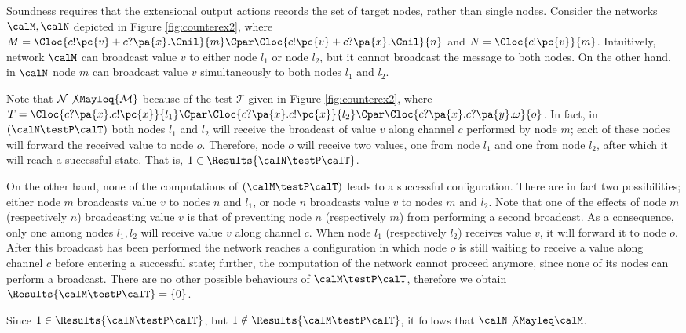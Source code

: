 \documentclass{LMCS}
\begin{document}
\begin{exa}
Soundness requires that the extensional output actions records the set of target nodes, rather than single nodes.
Consider the networks $\calM, \calN$ depicted in Figure \ref{fig:counterex2}, where 
$M = \Cloc{c!\pc{v} + c?\pa{x}.\Cnil}{m} \Cpar \Cloc{c!\pc{v} + c?\pa{x}.\Cnil}{n}$ and 
$N = \Cloc{c!\pc{v}}{m}$. 
Intuitively, network $\calM$ can broadcast value $v$ to either node $l_1$ or node $l_2$, 
but it cannot broadcast the message to both nodes. On the other hand, in $\calN$ node $m$ can 
broadcast value $v$ simultaneously to both nodes $l_1$ and $l_2$.

Note that 
${\mathcal N} \not\Mayleq {\mathcal M}$ because of the test
${\mathcal T}$ given in Figure \ref{fig:counterex2}, where $T = \Cloc{c?\pa{x}.c!\pc{x}}{l_1} \Cpar \Cloc{c?\pa{x}.c!\pc{x}}{l_2} 
\Cpar \Cloc{c?\pa{x}.c?\pa{y}.\omega}{o}$. 
In fact, in $(\calN \testP \calT)$ both nodes $l_1$ and $l_2$ will receive the broadcast of value $v$ along channel 
$c$ performed by node $m$; 
each of these nodes will forward the received value to node $o$. Therefore, node $o$ will receive two values, one 
from node $l_1$ and one from node $l_2$, after which it will reach a successful state. That is, 
$1 \in \Results{\calN \testP \calT}$.

On the other hand, none of the 
computations of $(\calM \testP \calT)$ leads to a successful configuration. 
There are in fact two possibilities; either node $m$ broadcasts value $v$ 
to nodes $n$ and $l_1$, or node $n$ broadcasts value $v$ to nodes $m$ 
and $l_2$.  Note that one of the effects of  node $m$ (respectively $n$) broadcasting value 
$v$ is that of preventing node $n$ (respectively $m$) from performing a second 
broadcast. 
As a consequence, only one among nodes $l_1, l_2$ will receive value $v$ 
along channel $c$. When node $l_1$ (respectively $l_2$) receives value $v$, it will 
forward it to node $o$. After this broadcast has been performed the network 
reaches a configuration in which node $o$ is still waiting to receive a 
value along channel $c$ before entering a successful state; further, 
the computation of the network cannot proceed anymore, 
since none of its nodes can perform a broadcast.
There are no other possible behaviours of 
$\calM \testP \calT$, therefore we obtain $\Results{\calM \testP \calT} = \{0\}$. 

Since $1 \in \Results{\calN \testP \calT}$, but $1 \notin \Results{\calM \testP \calT}$, 
it follows that $\calN \not\Mayleq \calM$.



\end{exa}
\end{document}
